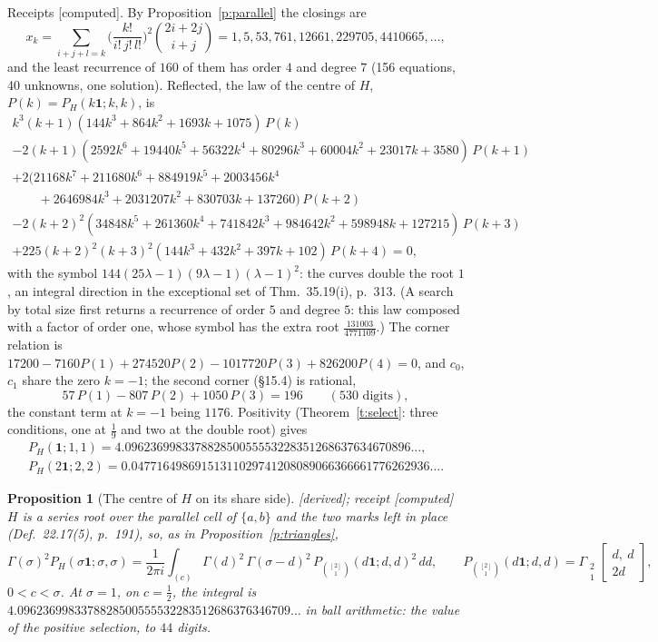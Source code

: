 \documentclass[11pt]{article}
\newcommand{\one}{\mathbf 1}
\newcommand{\Gst}[4]{\Gamma_{\substack{#1\\#2}}\!\begin{bmatrix}#3\\#4\end{bmatrix}}
\theoremstyle{plain}
\newtheorem{proposition}{Proposition}[section]
\theoremstyle{definition}
\theoremstyle{remark}
\newcommand{\derived}{\textup{[derived]}}
\newcommand{\computed}{\textup{[computed]}}
\begin{document}
\noindent Receipts \computed. By Proposition~\ref{p:parallel} the closings are
\[
x_k=\sum_{i+j+l=k}\Big(\frac{k!}{i!\,j!\,l!}\Big)^2\binom{2i+2j}{i+j}=1,5,53,761,12661,229705,4410665,\dots,
\]
and the least recurrence of $160$ of them has order $4$ and degree $7$ (156 equations, 40 unknowns, one solution). Reflected, the law of the centre of $H$, $P(k)=P_H(k\one;k,k)$, is
\begin{gather*}
k^3(k+1)(144k^3+864k^2+1693k+1075)\,P(k)\\
-2(k+1)(2592k^6+19440k^5+56322k^4+80296k^3+60004k^2+23017k+3580)\,P(k+1)\\
+2(21168k^7+211680k^6+884919k^5+2003456k^4\\
\qquad+2646984k^3+2031207k^2+830703k+137260)\,P(k+2)\\
-2(k+2)^2(34848k^5+261360k^4+741842k^3+984642k^2+598948k+127215)\,P(k+3)\\
+225(k+2)^2(k+3)^2(144k^3+432k^2+397k+102)\,P(k+4)=0,
\end{gather*}
with the symbol $144(25\lambda-1)(9\lambda-1)(\lambda-1)^2$: the curves double the root $1$, an integral direction in the exceptional set of Thm.~35.19(i), p.~313. (A search by total size first returns a recurrence of order $5$ and degree $5$: this law composed with a factor of order one, whose symbol has the extra root $\frac{131003}{4771109}$.) The corner relation is $17200-7160P(1)+274520P(2)-1017720P(3)+826200P(4)=0$, and $c_0$, $c_1$ share the zero $k=-1$; the second corner (\S15.4) is rational,
\[
57\,P(1)-807\,P(2)+1050\,P(3)=196\qquad(530\text{ digits}),
\]
the constant term at $k=-1$ being $1176$. Positivity (Theorem~\ref{t:select}: three conditions, one at $\frac19$ and two at the double root) gives
\begin{gather*}
P_H(\one;1,1)=4.096236998337882850055553228351268637634670896\ldots,\\
P_H(2\one;2,2)=0.04771649869151311029741208089066366661776262936\ldots .
\end{gather*}

\begin{proposition}[The centre of $H$ on its share side]\label{p:Hshare}\derived; receipt \computed\
$H$ is a series root over the parallel cell of $\{a,b\}$ and the two marks left in place (Def.~22.17(5), p.~191), so, as in Proposition~\ref{p:triangles},
\[
\Gamma(\sigma)^2P_H(\sigma\one;\sigma,\sigma)=\frac1{2\pi i}\int_{(c)}\Gamma(d)^2\,\Gamma(\sigma-d)^2\,P_{\binom{[2]}1}(d\one;d,d)^2\,dd,\qquad P_{\binom{[2]}1}(d\one;d,d)=\Gst21{d,\ d}{2d},
\]
$0<c<\sigma$. At $\sigma=1$, on $c=\frac12$, the integral is $4.0962369983378828500555532283512686376346709\ldots$ in ball arithmetic: the value of the positive selection, to $44$ digits.
\end{proposition}
\end{document}
